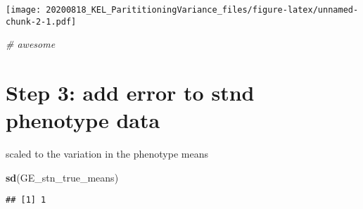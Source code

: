 \documentclass[]{article}
\newenvironment{Shaded}{\begin{snugshade}}{\end{snugshade}}
\newcommand{\CommentTok}[1]{\textcolor[rgb]{0.56,0.35,0.01}{\textit{#1}}}
\newcommand{\DataTypeTok}[1]{\textcolor[rgb]{0.13,0.29,0.53}{#1}}
\newcommand{\DecValTok}[1]{\textcolor[rgb]{0.00,0.00,0.81}{#1}}
\newcommand{\KeywordTok}[1]{\textcolor[rgb]{0.13,0.29,0.53}{\textbf{#1}}}
\newcommand{\NormalTok}[1]{#1}
\newcommand{\OperatorTok}[1]{\textcolor[rgb]{0.81,0.36,0.00}{\textbf{#1}}}
\newcommand{\StringTok}[1]{\textcolor[rgb]{0.31,0.60,0.02}{#1}}
\begin{document}
\texttt{[image: 20200818\_KEL\_ParititioningVariance\_files/figure-latex/unnamed-chunk-2-1.pdf]}

\begin{Shaded}
\begin{Highlighting}[]
      \CommentTok{# awesome}
\end{Highlighting}
\end{Shaded}

\hypertarget{step-3-add-error-to-stnd-phenotype-data}{%
\section{Step 3: add error to stnd phenotype
data}\label{step-3-add-error-to-stnd-phenotype-data}}

scaled to the variation in the phenotype means

\begin{Shaded}
\begin{Highlighting}[]
\KeywordTok{sd}\NormalTok{(GE_stn_true_means)}
\end{Highlighting}
\end{Shaded}

\begin{verbatim}
## [1] 1
\end{verbatim}

\begin{Shaded}
\end{Shaded}
\end{document}
